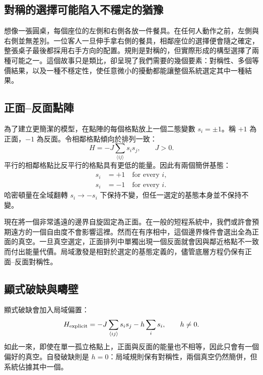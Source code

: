 \subsection{對稱的選擇可能陷入不穩定的猶豫}

想像一張圓桌，每個座位的左側和右側各放一件餐具。在任何人動作之前，左側與右側並無差別。一位客人一旦伸手拿右側的餐具，相鄰座位的選擇便會隨之確定，整張桌子最後都採用右手方向的配置。規則是對稱的，但實際形成的構型選擇了兩種可能之一。這個故事只是類比，卻呈現了我們需要的幾個要素：對稱性、多個等價結果，以及一種不穩定性，使任意微小的擾動都能讓整個系統選定其中一種結果。

\subsection{正面--反面點陣}

為了建立更簡潔的模型，在點陣的每個格點放上一個二態變數 \(s_i=\pm1\)。稱 \(+1\) 為正面，\(-1\) 為反面。令相鄰格點傾向於排列一致：
\begin{equation}
  H=-J\sum_{\langle ij\rangle}s_i s_j,
  \qquad J>0.
\end{equation}
平行的相鄰格點比反平行的格點具有更低的能量。因此有兩個簡併基態：
\begin{equation}
\begin{aligned}
  s_i&=+1\quad\text{for every }i,
  \\
  s_i&=-1\quad\text{for every }i.
\end{aligned}
\end{equation}
哈密頓量在全域翻轉 \(s_i\to-s_i\) 下保持不變，但任一選定的基態本身並不保持不變。

現在將一個非常遙遠的邊界自旋固定為正面。在一般的短程系統中，我們或許會預期遠方的一個自由度不會影響這裡。然而在有序相中，這個邊界條件會選出全為正面的真空。一旦真空選定，正面排列中單獨出現一個反面就會因與鄰近格點不一致而付出能量代價。局域激發是相對於選定的基態定義的，儘管底層方程仍保有正面--反面對稱性。

\subsection{顯式破缺與疇壁}

顯式破缺會加入局域偏置：
\begin{equation}
  H_{\rm explicit}
  =-J\sum_{\langle ij\rangle}s_i s_j-h\sum_i s_i,
  \qquad h\ne0.
\end{equation}
如此一來，即使在單一孤立格點上，正面與反面的能量也不相等，因此只會有一個偏好的真空。自發破缺則是 \(h=0\)：局域規則保有對稱性，兩個真空仍然簡併，但系統佔據其中一個。

